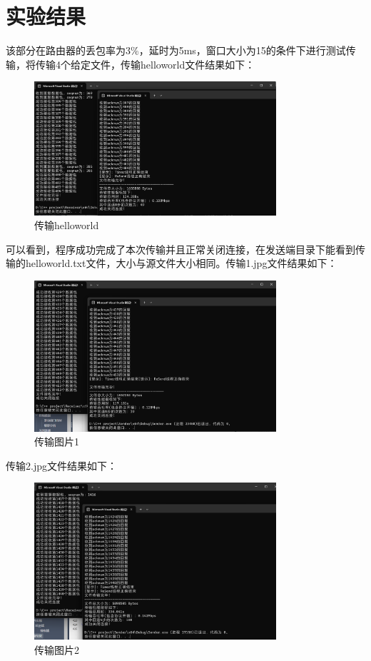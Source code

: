 \documentclass[UTF8,a4paper,10pt]{ctexart}
\begin{document}
\section{实验结果}
该部分在路由器的丢包率为3\%，延时为5ms，窗口大小为15的条件下进行测试传输，将传输4个给定文件，传输helloworld文件结果如下：
\begin{figure}[H]
    \centering
\includegraphics[width=0.8\textwidth]{img/传输helloworld.png}
    \caption{传输helloworld}
\end{figure}
可以看到，程序成功完成了本次传输并且正常关闭连接，在发送端目录下能看到传输的helloworld.txt文件，大小与源文件大小相同。传输1.jpg文件结果如下：
\begin{figure}[H]
    \centering
\includegraphics[width=0.8\textwidth]{img/传输图片1.png}
    \caption{传输图片1}
\end{figure}
传输2.jpg文件结果如下：
\begin{figure}[H]
    \centering
\includegraphics[width=0.8\textwidth]{img/传输图片2.png}
    \caption{传输图片2}
\end{figure}
\end{document}
